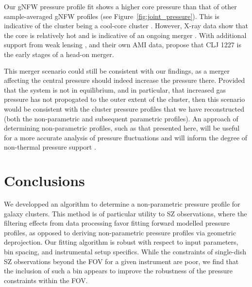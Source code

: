 \documentclass[twocolumn,traditabstract]{aa}
\begin{document}

Our gNFW pressure profile fit shows a higher core pressure than that of other sample-averaged gNFW profiles
(see Figure~\ref{fig:joint_pressure}). This is indicative of the cluster being a cool-core cluster .
However, X-ray data show that the core is relatively hot and is indicative of an ongoing merger \citep[][]{maughan2007}.
With additional support from weak lensing \citep{jee2009a}, and their own AMI data, \citet{rumsey2016}
propose that CLJ 1227 is the early stages of a head-on merger.

This merger scenario could still be consistent with our findings, as a merger affecting the central pressure should indeed
increase the pressure there. Provided that the system is not in equilibrium, and in particular, that increased gas pressure
has not propogated to the outer extent of the cluster, then this scenario would be consistent with the cluster pressure profiles
that we have reconstructed (both the non-parametric and subsequent parametric profiles). An approach of determining non-parametric
profiles, such as that presented here, will be useful for a more accurate analysis of pressure fluctuations and will inform
the degree of non-thermal pressure support \citep[e.g.][]{khatri2016}.



\section{Conclusions}
\label{sec:conclusions}

We developped an algorithm to determine a non-parametric pressure profile for galaxy clusters.
This method is of particular utility to SZ observations, where the filtering effects from data
processing favor fitting forward modelled pressure profiles, as opposed to deriving non-parametric pressure profiles via
geometric deprojection. Our fitting algorithm is robust with respect to input parameters,
bin spacing, and instrumental setup specifics. While the constraints of single-dish SZ observations
beyond the FOV for a given instrument are poor, we find that the inclusion of such a bin
appears to improve the robustness of the pressure constraints within the FOV.
\end{document}
